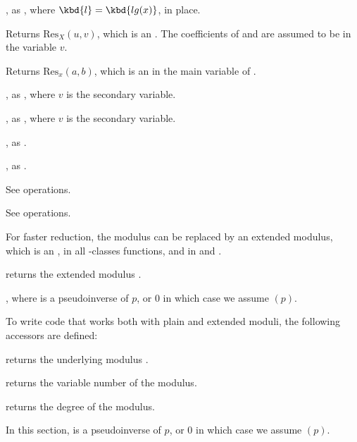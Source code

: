 , as , where
$\kbd{l} = \kbd{lg(x)}$, in place.

 Returns
$\text{Res}_X(u, v)$, which is an . The coefficients of 
and  are assumed to be in the variable $v$.

Returns $\text{Res}_x(a, b)$, which is an 
in the main variable of .

, as ,
where $v$ is the secondary variable.

, as ,
where $v$ is the secondary variable.

, as .

, as
.

 See  operations.


 See  operations.


For faster reduction, the modulus  can be replaced by an extended
modulus, which is an , in all -classes
functions, and in  and .

 returns the extended modulus
.

, where 
is a pseudoinverse of $p$, or $0$ in which case we assume
$(p)$.

To write code that works both with plain and extended moduli, the following
accessors are defined:

 returns the underlying modulus .

 returns the variable number of the modulus.

 returns the degree of the modulus.


In this section,  is a pseudoinverse of $p$, or $0$ in which case we
assume $(p)$.

